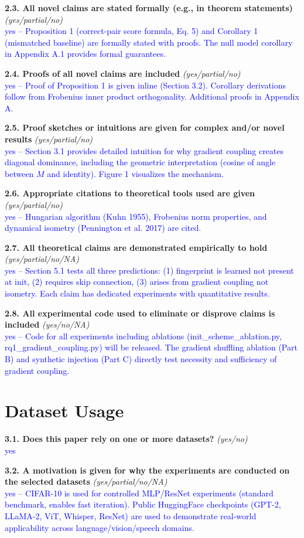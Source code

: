 \documentclass[letterpaper]{article}
\newcommand{\question}[3]{%
    \textbf{#1} \textit{#2}\\
    \textcolor{blue}{#3}\par
}
\begin{document}
\question{2.3. All novel claims are stated formally (e.g., in theorem statements)}
{(yes/partial/no)}
{yes -- Proposition 1 (correct-pair score formula, Eq. 5) and Corollary 1 (mismatched baseline) are formally stated with proofs. The null model corollary in Appendix A.1 provides formal guarantees.}

\question{2.4. Proofs of all novel claims are included}
{(yes/partial/no)}
{yes -- Proof of Proposition 1 is given inline (Section 3.2). Corollary derivations follow from Frobenius inner product orthogonality. Additional proofs in Appendix A.}

\question{2.5. Proof sketches or intuitions are given for complex and/or novel results}
{(yes/partial/no)}
{yes -- Section 3.1 provides detailed intuition for why gradient coupling creates diagonal dominance, including the geometric interpretation (cosine of angle between $M$ and identity). Figure 1 visualizes the mechanism.}

\question{2.6. Appropriate citations to theoretical tools used are given}
{(yes/partial/no)}
{yes -- Hungarian algorithm (Kuhn 1955), Frobenius norm properties, and dynamical isometry (Pennington et al. 2017) are cited.}

\question{2.7. All theoretical claims are demonstrated empirically to hold}
{(yes/partial/no/NA)}
{yes -- Section 5.1 tests all three predictions: (1) fingerprint is learned not present at init, (2) requires skip connection, (3) arises from gradient coupling not isometry. Each claim has dedicated experiments with quantitative results.}

\question{2.8. All experimental code used to eliminate or disprove claims is included}
{(yes/no/NA)}
{yes -- Code for all experiments including ablations (init\_scheme\_ablation.py, rq1\_gradient\_coupling.py) will be released. The gradient shuffling ablation (Part B) and synthetic injection (Part C) directly test necessity and sufficiency of gradient coupling.}

\section{Dataset Usage}

\question{3.1. Does this paper rely on one or more datasets?}
{(yes/no)}
{yes}

\question{3.2. A motivation is given for why the experiments are conducted on the selected datasets}
{(yes/partial/no/NA)}
{yes -- CIFAR-10 is used for controlled MLP/ResNet experiments (standard benchmark, enables fast iteration). Public HuggingFace checkpoints (GPT-2, LLaMA-2, ViT, Whisper, ResNet) are used to demonstrate real-world applicability across language/vision/speech domains.}
\end{document}

